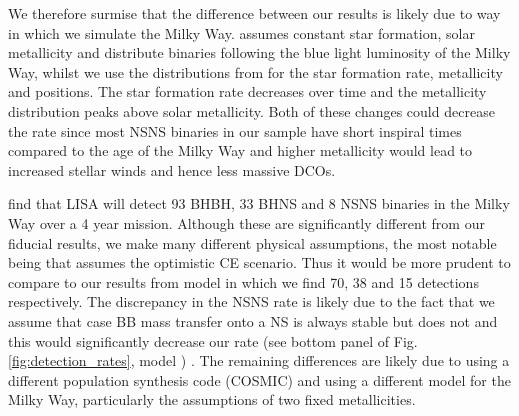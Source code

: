 We therefore surmise that the difference between our results is likely due to way in which we simulate the Milky Way. \citet{Lau+2020} assumes constant star formation, solar metallicity and distribute binaries following the blue light luminosity of the Milky Way, whilst we use the distributions from \citet{Frankel+2018} for the star formation rate, metallicity and positions. The \citet{Frankel+2018} star formation rate decreases over time and the metallicity distribution peaks above solar metallicity. Both of these changes could decrease the rate since most NSNS binaries in our sample have short inspiral times compared to the age of the Milky Way and higher metallicity would lead to increased stellar winds and hence less massive DCOs.

\citet{Breivik+2020} find that LISA will detect 93 BHBH, 33 BHNS and 8 NSNS binaries in the Milky Way over a 4 year mission. Although these are significantly different from our fiducial results, we make many different physical assumptions, the most notable being that \citet{Breivik+2020} assumes the optimistic CE scenario. Thus it would be more prudent to compare to our results from model \modOpt{} in which we find 70, 38 and 15 detections respectively. The discrepancy in the NSNS rate is likely due to the fact that we assume that case BB mass transfer onto a NS is always stable but \citet{Breivik+2020} does not and this would significantly decrease our rate (see bottom panel of Fig.\,\ref{fig:detection_rates}, model \modCaseBB{}) . The remaining differences are likely due to using a different population synthesis code (COSMIC) and using a different model for the Milky Way, particularly the assumptions of two fixed metallicities.